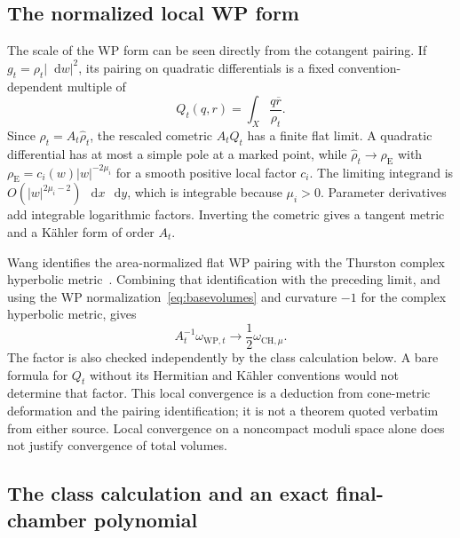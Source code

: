 \documentclass[11pt,a4paper]{article}
\numberwithin{equation}{section}
\theoremstyle{definition}
\theoremstyle{remark}
\newcommand{\dd}{\mathop{}\!\mathrm d}
\newcommand{\WP}{\mathrm{WP}}
\begin{document}
\subsection{The normalized local WP form}

The scale of the WP form can be seen directly from the cotangent
pairing. If $g_t=\rho_t|\dd w|^2$, its pairing on quadratic
differentials is a fixed convention-dependent multiple of
\[
 Q_t(q,r)=\int_X\frac{q\overline r}{\rho_t}.
\]
Since $\rho_t=A_t\widehat\rho_t$, the rescaled cometric $A_tQ_t$
has a finite flat limit. A quadratic differential has at most a
simple pole at a marked point, while
$\widehat\rho_t\to\rho_{\mathrm E}$ with
$\rho_{\mathrm E}=c_i(w)|w|^{-2\mu_i}$ for a smooth positive local
factor $c_i$. The limiting integrand is
$O(|w|^{2\mu_i-2})\,\dd x\,\dd y$, which is integrable because
$\mu_i>0$. Parameter derivatives add integrable logarithmic factors.
Inverting the cometric gives a tangent metric and a K\"ahler form
of order $A_t$.

Wang identifies the area-normalized flat WP pairing with the
Thurston complex hyperbolic metric~\cite{WangFlatWP}. Combining
that identification with the preceding limit, and using the WP
normalization~\eqref{eq:basevolumes} and curvature $-1$ for the
complex hyperbolic metric, gives
\begin{equation}
 \boxed{\quad A_t^{-1}\omega_{\WP,t}
       \longrightarrow\frac12\omega_{\mathrm{CH},\mu}.\quad}
 \label{eq:localWPCHlimit}
\end{equation}
The factor is also checked independently by the class calculation
below. A bare formula for $Q_t$ without its Hermitian and K\"ahler
conventions would not determine that factor. This local convergence
is a deduction from cone-metric deformation and the pairing
identification; it is not a theorem quoted verbatim from either
source. Local convergence on a noncompact moduli space alone does
not justify convergence of total volumes.

\subsection{The class calculation and an exact final-chamber polynomial}
\end{document}
